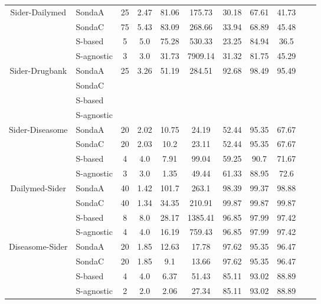 \begin{center}
\begin{table*}[h]
\begin{tabular}{|c|l|c|c|c|c|c|c|c|c|c|}
\multirow{4}{*}{Sider-Dailymed} & SondaA   & 25 & 2.47   & 81.06  & 175.73   & 30.18 & 67.61 & 41.73   \\
											& SondaC  & 75 & 5.43   & 83.09  & 268.66    & 33.94 & 68.89 & 45.48 \\
											& S-based    & 5 & 5.0   & 75.28  & 530.33 & 23.25 & 84.94 & 36.5 \\
 											& S-agnostic     & 3 & 3.0   & 31.73  & 7909.14      & 31.32 & 81.75 & 45.29 \\ \hline 		
 																							
\multirow{4}{*}{Sider-Drugbank} & SondaA  & 25 & 3.26   & 51.19  & 284.51 & 92.68 & 98.49 & 95.49   \\
											& SondaC  \\
											& S-based \\
 											& S-agnostic      \\ \hline 											

\multirow{4}{*}{Sider-Diseasome} & SondaA    & 20 & 2.02   & 10.75  & 24.19     & 52.44 & 95.35 & 67.67\\
											& SondaC    & 20 & 2.03   & 10.2  & 23.11 & 52.44 & 95.35 & 67.67  \\
											& S-based    & 4 & 4.0   & 7.91  & 99.04  & 59.25 & 90.7 & 71.67\\
 											& S-agnostic    & 3 & 3.0   & 1.35  & 49.44  & 61.33 & 88.95 & 72.6      \\ \hline 		 									

\multirow{4}{*}{Dailymed-Sider} & SondaA    & 40 & 1.42   & 101.7  & 263.1   & 98.39 & 99.37 & 98.88  \\
											& SondaC  & 40 & 1.34   & 34.35  & 210.91  & 99.87 & 99.87 & 99.87 \\
											& S-based    & 8 & 8.0   & 28.17  & 1385.41  & 96.85 & 97.99 & 97.42\\
 											& S-agnostic    & 4 & 4.0   & 16.19  & 759.43    & 96.85 & 97.99 & 97.42  \\ \hline 		

\multirow{4}{*}{Diseasome-Sider} & SondaA    & 20 & 1.85   & 12.63  & 17.78   & 97.62 & 95.35 & 96.47  \\
											& SondaC   & 20 & 1.85   & 9.1  & 13.66   & 97.62 & 95.35 & 96.47 \\
											& S-based  & 4 & 4.0   & 6.37  & 51.43   & 85.11 & 93.02 & 88.89 \\
 											& S-agnostic    & 2 & 2.0   & 2.06  & 27.34   & 85.11 & 93.02 & 88.89  \\ \hline 		 									


\end{tabular}
\end{table*}
\end{center}
